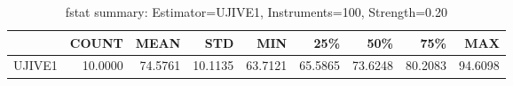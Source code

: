 \begin{table}[ht]
\centering
\caption{fstat summary: Estimator=UJIVE1, Instruments=100, Strength=0.20}
\begin{tabular}{lrrrrrrrr}
\toprule
 & COUNT & MEAN & STD & MIN & 25\% & 50\% & 75\% & MAX \\
\midrule
UJIVE1 & 10.0000 & 74.5761 & 10.1135 & 63.7121 & 65.5865 & 73.6248 & 80.2083 & 94.6098 \\
\bottomrule
\end{tabular}
\end{table}
